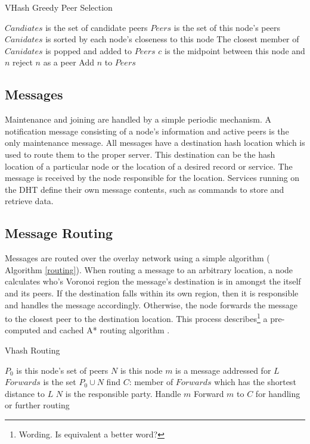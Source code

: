 \documentclass{IEEEtran}
\begin{document}
\begin{algorithm}
\caption{VHash Greedy Peer Selection}
\label{peer}
\begin{algorithmic}[1]  %
	\STATE $Candiates$ is the set of candidate peers
    \STATE $Peers$ is the set of this node's peers
    \STATE $Canidates$ is sorted by each node's closeness to this node
    \STATE The closest member of $Canidates$ is popped and added to $Peers$
    	\STATE $c$ is the midpoint between this node and $n$
        	\STATE reject $n$ as a peer
        \ELSE
        	\STATE Add $n$ to $Peers$
        \ENDIF
    \ENDFOR
\end{algorithmic}
\end{algorithm}


\subsection{Messages}
Maintenance and joining are handled by a simple periodic mechanism. A notification message consisting of a node's information and active peers is the only maintenance message. All messages have a destination hash location which is used to route them to the proper server. This destination can be the hash location of a particular node or the location of a desired record or service.  The message is received by the node responsible for the location. Services running on the DHT define their own message contents, such as commands to store and retrieve data.

\subsection{Message Routing}
Messages are routed over the overlay network using a simple algorithm ( Algorithm \ref{routing}). 
When routing a message to an arbitrary location, a node calculates who's Voronoi region the message's destination is in amongst the itself and its peers. If the destination falls within its own region, then it is responsible and handles the message accordingly. Otherwise, the node forwards the message to the closest peer to the destination location. This process describes\footnote{Wording.  Is equivalent a better word?} a pre-computed and cached A* routing  algorithm \cite{astar} . 

\begin{algorithm}
\caption{Vhash Routing}
\label{routing}
\begin{algorithmic}[1]  %
	\STATE $P_0$ is this node's set of peers
    \STATE $N$ is this node
	\STATE $m$ is a message addressed for $L$
    \STATE $Forwards$ is the set $P_0\cup{}N$
    \STATE find $C$: member of $Forwards$ which has the shortest distance to $L$
    	\STATE $N$ is the responsible party.
        \STATE Handle $m$
    \ELSE
    	\STATE Forward $m$ to $C$ for handling or further routing
    \ENDIF
\end{algorithmic}
\end{algorithm}
\end{document}

